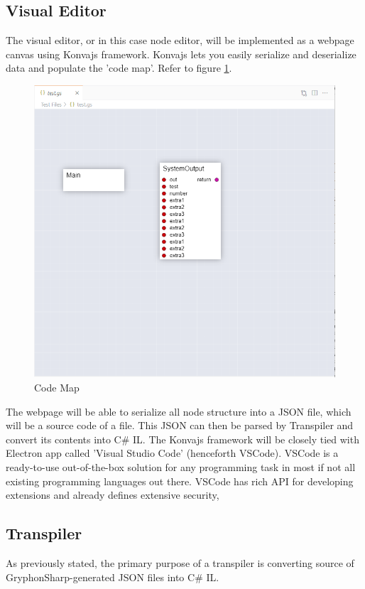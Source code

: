 \documentclass{article}
\begin{document}
\subsection*{Visual Editor}
The visual editor, or in this case node editor, will be implemented as a webpage canvas using Konvajs framework.
Konvajs lets you easily serialize and deserialize data and populate the 'code map'. Refer to figure \ref{fig:codemap}.

\begin{figure}[H]
\centering
\includegraphics[width=1\textwidth]{codemap.PNG}
\caption{Code Map}
\label{fig:codemap}
\end{figure}

The webpage will be able to serialize all node structure into a JSON file, which will be a source code of a file. This JSON can then be parsed by Transpiler and convert its contents into C\# IL.
The Konvajs framework will be closely tied with Electron app called 'Visual Studio Code' (henceforth VSCode). VSCode is a ready-to-use out-of-the-box solution for any programming task in most if not all existing programming languages out there. VSCode has rich API for developing extensions and already defines extensive security, 
\subsection*{Transpiler}
As previously stated, the primary purpose of a transpiler is converting source of GryphonSharp-generated JSON files into C\# IL.
\end{document}
